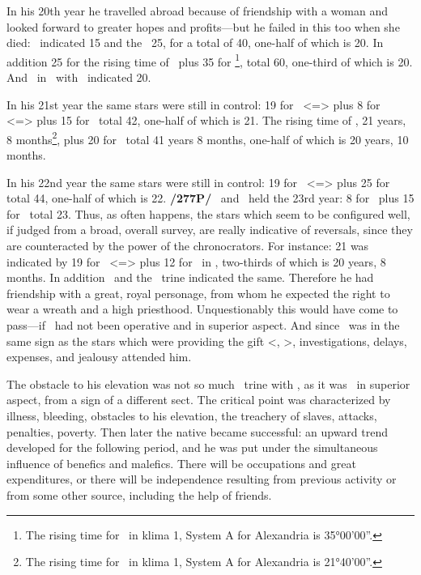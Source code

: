 In his 20th year he travelled abroad because of friendship with
a woman and looked forward to greater hopes and profits—but he failed in this too when she died: \Mars \, indicated 15 and the \Moon\, 25, for a total of 40, one-half of which is 20. In addition 25 for the rising time of \Taurus\, plus 35 for \Leo\footnote{The rising time for \Leo\, in klima 1, System A for Alexandria is 35°00'00''.}, total 60, one-third of which is 20. And \Mercury\, in \Aries\, with \Saturn\, indicated 20. 

In his 21st year the same stars were still in control: 19 for \Leo\, <=\Sun> plus 8 for \Taurus\, <=\Venus> plus 15 for \Mars\, total 42, one-half of which is 21. The rising time of \Aries, 21 years, 8 months\footnote{The rising time for \Aries\, in klima 1, System A for Alexandria is 21°40'00''.}, plus 20 for \Mercury\, total 41 years 8 months, one-half of which is 20 years, 10 months. 

In his 22nd year the same stars were still in control: 19 for \Leo\, <=\Sun> plus 25 for \Taurus\, total 44, one-half of which is 22. \textbf{/277P/} \Venus\, and \Mars\, held the 23rd year: 8 for \Venus\, plus 15 for \Mars\, total 23. Thus, as often happens, the stars which seem to be configured well, if judged from a broad, overall survey, are really indicative of reversals, since they are counteracted by the power of the chronocrators. For instance: 21 was indicated by 19 for \Leo\, <=\Sun> plus 12 for \Jupiter\, in \Leo, two-thirds of which is 20 years, 8 months. In addition \Jupiter\, and the \Sun\, trine indicated the same. Therefore he had friendship with a great, royal personage, from whom he expected the right to wear a wreath and a high priesthood. Unquestionably this would have come to pass—if \Mars\, had not been operative and in superior aspect. And since \Saturn\, was in the same sign as the stars which were providing the gift <\Sun, \Mercury>, investigations, delays, expenses, and jealousy attended him. 

The obstacle to his elevation was not so much \Saturn\, trine with \Jupiter, as it was \Mars\, in superior aspect, from a sign of a different sect. The critical point was characterized by illness, bleeding, obstacles to his elevation, the treachery of slaves, attacks, penalties, poverty. Then later the native became successful: an upward trend developed for the
following period, and he was put under the simultaneous influence of benefics and malefics. There will be occupations and great expenditures, or there will be independence resulting from previous activity or from some other source, including the help of friends.

